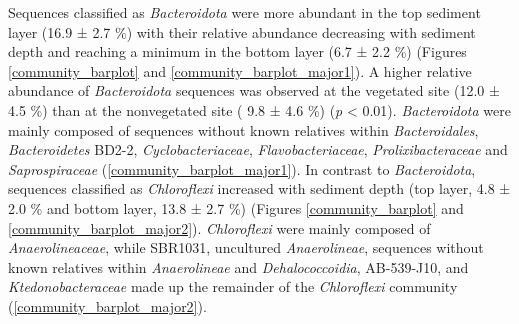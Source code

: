 \documentclass[12pt,]{article}
\begin{document}
Sequences classified as \emph{Bacteroidota} were more abundant in the
top sediment layer (16.9 ± 2.7 \si{\percent}) with their relative
abundance decreasing with sediment depth and reaching a minimum in the
bottom layer (6.7 ± 2.2 \si{\percent}) (Figures \ref{community_barplot}
and \ref{community_barplot_major1}). A higher relative abundance of
\emph{Bacteroidota} sequences was observed at the vegetated site (12.0 ±
4.5 \si{\percent}) than at the nonvegetated site ( 9.8 ± 4.6
\si{\percent}) (\emph{p} \textless{} 0.01). \emph{Bacteroidota} were
mainly composed of sequences without known relatives within
\emph{Bacteroidales}, \emph{Bacteroidetes} BD2-2,
\emph{Cyclobacteriaceae}, \emph{Flavobacteriaceae},
\emph{Prolixibacteraceae} and \emph{Saprospiraceae}
(\autoref{community_barplot_major1}). In contrast to
\emph{Bacteroidota}, sequences classified as \emph{Chloroflexi}
increased with sediment depth (top layer, 4.8 ± 2.0 \si{\percent} and
bottom layer, 13.8 ± 2.7 \si{\percent}) (Figures \ref{community_barplot}
and \ref{community_barplot_major2}). \emph{Chloroflexi} were mainly
composed of \emph{Anaerolineaceae}, while SBR1031, uncultured
\emph{Anaerolineae}, sequences without known relatives within
\emph{Anaerolineae} and \emph{Dehalococcoidia}, AB-539-J10, and
\emph{Ktedonobacteraceae} made up the remainder of the
\emph{Chloroflexi} community (\autoref{community_barplot_major2}).
\end{document}
